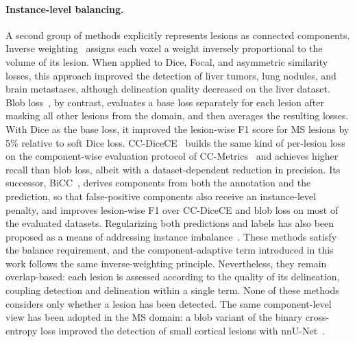 \paragraph{Instance-level balancing.}
A second group of methods explicitly represents lesions as connected
components. Inverse weighting~\cite{shirokikh_universal_2020} assigns each
voxel a weight inversely proportional to the volume of its lesion. When
applied to Dice, Focal, and asymmetric similarity losses, this approach
improved the detection of liver tumors, lung nodules, and brain metastases,
although delineation quality decreased on the liver dataset. Blob
loss~\cite{kofler_blob_2023}, by contrast, evaluates a base loss separately
for each lesion after masking all other lesions from the domain, and then
averages the resulting losses. With Dice as the base loss, it improved the
lesion-wise F1 score for MS lesions by 5\% relative to soft Dice loss.
CC-DiceCE~\cite{bouteille_learning_2026} builds the same kind of
per-lesion loss on the component-wise evaluation protocol of
CC-Metrics~\cite{jaus_every_2025} and achieves higher recall than blob loss,
albeit with a dataset-dependent reduction in precision. Its successor,
BiCC~\cite{bouteille_bicc_2026}, derives components from both the
annotation and the prediction, so that false-positive components also
receive an instance-level penalty, and improves lesion-wise F1 over
CC-DiceCE and blob loss on most of the evaluated datasets. Regularizing both
predictions and labels has also been proposed as a means of addressing
instance imbalance~\cite{aqib_javed_novel_2025}. These methods satisfy the
balance requirement, and the component-adaptive term introduced in this
work follows the same inverse-weighting principle. Nevertheless, they
remain overlap-based: each lesion is assessed according to the quality of
its delineation, coupling detection and delineation within a single term.
None of these methods considers only whether a lesion has been detected.
The same component-level view has been adopted in the MS domain: a blob
variant of the binary cross-entropy loss improved the detection of small
cortical lesions with nnU-Net~\cite{molchanova_benchmarking_2025}.

